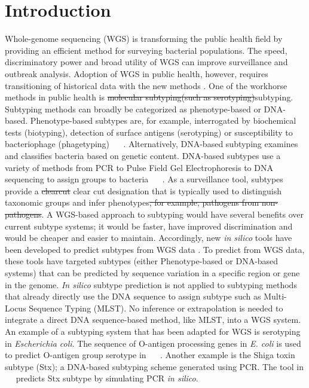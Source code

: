 \documentclass{bioinfo}
\providecommand{\DIFadd}[1]{{\protect\color{red}#1}} %
\providecommand{\DIFdel}[1]{{\protect\color{red}\sout{#1}}}                      %
\providecommand{\DIFaddbegin}{} %
\providecommand{\DIFaddend}{} %
\providecommand{\DIFdelbegin}{} %
\providecommand{\DIFdelend}{} %
\begin{document}
\maketitle

\section{Introduction}

Whole-genome sequencing (WGS) is transforming the public health field by providing an efficient method for surveying bacterial populations.
The speed, discriminatory power and broad utility of WGS can improve surveillance and outbreak analysis.
Adoption of WGS in public health, however, requires transitioning of historical data with the new methods \citep{Jenkins2015}.
One of the workhorse methods in public health is \DIFdelbegin \DIFdel{molecular subtyping(such as serotyping)}\DIFdelend \DIFaddbegin \DIFadd{subtyping.
Subtyping methods can broadly be categorized as phenotype-based or DNA-based.
Phenotype-based subtypes are, for example, interrogated by biochemical tests (biotyping), detection of surface antigens (serotyping) or susceptibility to bacteriophage (phagetyping) \mbox{%
\citep{Wiedmann2002}
}%
.
Alternatively, DNA-based subtyping examines and classifies bacteria based on genetic content.
DNA-based subtypes use a variety of methods from PCR to Pulse Field Gel Electrophoresis to DNA sequencing to assign groups to bacteria \mbox{%
\citep{Wiedmann2002}
}%
}\DIFaddend .
As a surveillance tool, subtypes provide a \DIFdelbegin \DIFdel{clearcut }\DIFdelend \DIFaddbegin \DIFadd{clear cut }\DIFaddend designation that is typically used to distinguish taxonomic groups and infer phenotypes\DIFdelbegin \DIFdel{, for example, pathogens from non-pathogens}\DIFdelend .
A WGS-based approach to subtyping would have several benefits over current subtype systems; it would be faster, have improved discrimination and would be cheaper and easier to maintain\citep{Jenkins2015}.
Accordingly, new \textit{in silico} tools have been developed to predict subtypes from WGS data \citep{Joensen2015,Ingle2016,CARRILLO2016}.
\DIFaddbegin \DIFadd{To predict from WGS data, these tools have targeted subtypes (either Phenotype-based or DNA-based systems) that can be predicted by sequence variation in a specific region or gene in the genome.
}\textit{\DIFadd{In silico}} \DIFadd{subtype prediction is not applied to subtyping methods that already directly use the DNA sequence to assign subtype such as Multi-Locus Sequence Typing (MLST). 
No inference or extrapolation is needed to integrate a direct DNA sequence-based method, like MLST, into a WGS system.
An example of a subtyping system that has been adapted for WGS is serotyping in }\textit{\DIFadd{Escherichia coli}}\DIFadd{.
The sequence of O-antigen processing genes in }\textit{\DIFadd{E. coli}} \DIFadd{is used to predict O-antigen group serotype in \mbox{%
\citep{Joensen2015,Ingle2016}
}%
.
Another example is the Shiga toxin subtype (Stx); a DNA-based subtyping scheme generated using PCR.
The tool in \mbox{%
\citep{CARRILLO2016}
}%
predicts Stx subtype by simulating PCR }\textit{\DIFadd{in silico}}\DIFadd{.
}\DIFaddend 
\end{document}
